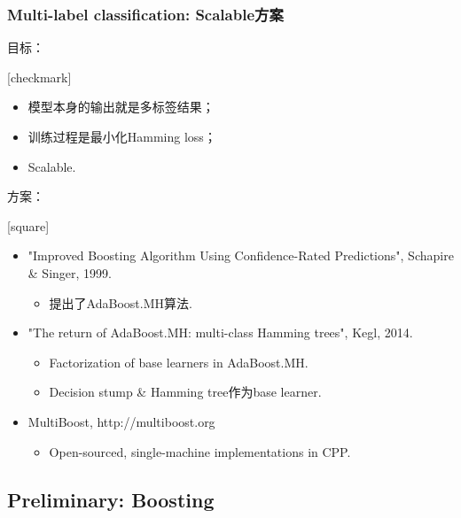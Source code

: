 \documentclass{beamer}
\begin{document}
\begin{frame}
\frametitle{Multi-label classification: Scalable方案}
目标：
  {
    [checkmark]
    \begin{itemize}
      \item 模型本身的输出就是多标签结果；
      \item 训练过程是最小化Hamming loss；
      \item Scalable.
    \end{itemize}
  }
\pause

方案：
  {
    [square]
    \begin{itemize}
      \item {\color{purple} "Improved Boosting Algorithm Using Confidence-Rated Predictions", Schapire \& Singer, 1999.}
      \begin{itemize}
        \item 提出了AdaBoost.MH算法.
      \end{itemize}
      \item {\color{purple} "The return of AdaBoost.MH: multi-class Hamming trees", Kegl, 2014.}
      \begin{itemize}
        \item Factorization of base learners in AdaBoost.MH.
        \item Decision stump \& Hamming tree作为base learner.
      \end{itemize}
      \item {\color{purple} MultiBoost, http://multiboost.org}
      \begin{itemize}
        \item Open-sourced, single-machine implementations in CPP.
      \end{itemize}
    \end{itemize}
  }
\end{frame}

\subsection{Preliminary: Boosting}
\end{document}

